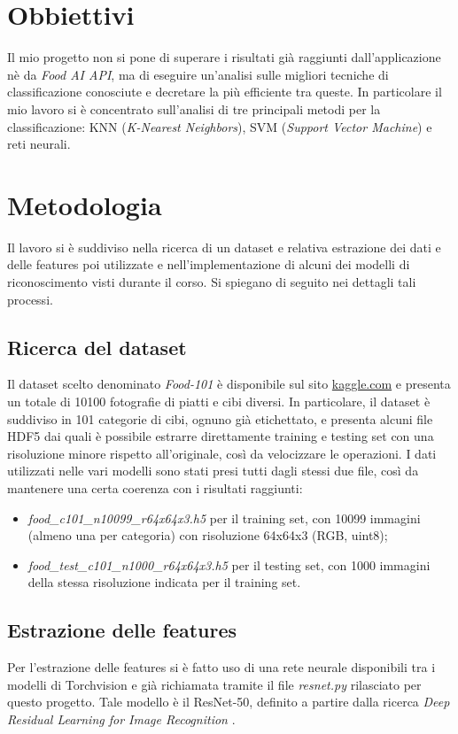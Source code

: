 \documentclass[11pt, a4paper, titlepage]{article}
\begin{document}
\section{Obbiettivi}
Il mio progetto non si pone di superare i risultati già raggiunti dall'applicazione nè da \textit{Food AI API}, ma di eseguire un'analisi sulle migliori tecniche di classificazione conosciute e decretare la più efficiente tra queste. In particolare il mio lavoro si è concentrato sull'analisi di tre principali metodi per la classificazione: KNN (\textit{K-Nearest Neighbors}), SVM (\textit{Support Vector Machine}) e reti neurali. 

\pagebreak

\section{Metodologia}
Il lavoro si è suddiviso nella ricerca di un dataset e relativa estrazione dei dati e delle features poi utilizzate e nell'implementazione di alcuni dei modelli di riconoscimento visti durante il corso. Si spiegano di seguito nei dettagli tali processi. 

\subsection{Ricerca del dataset}
Il dataset scelto denominato \emph{Food-101} \cite{food-101} è disponibile sul sito \url{kaggle.com} e presenta un totale di 10100 fotografie di piatti e cibi diversi. In particolare, il dataset è suddiviso in 101 categorie di cibi, ognuno già etichettato, e presenta alcuni file HDF5 dai quali è possibile estrarre direttamente training e testing set con una risoluzione minore rispetto all'originale, così da velocizzare le operazioni. I dati utilizzati nelle vari modelli sono stati presi tutti dagli stessi due file, così da mantenere una certa coerenza con i risultati raggiunti:
\begin{itemize}
    \item \textit{food\_c101\_n10099\_r64x64x3.h5} per il training set, con 10099 immagini (almeno una per categoria) con risoluzione 64x64x3 (RGB, uint8);
    \item \textit{food\_test\_c101\_n1000\_r64x64x3.h5} per il testing set, con 1000 immagini della stessa risoluzione indicata per il training set. 
\end{itemize}

\subsection{Estrazione delle features}
Per l'estrazione delle features si è fatto uso di una rete neurale disponibili tra i modelli di Torchvision e già richiamata tramite il file \emph{resnet.py} rilasciato per questo progetto. Tale modello è il ResNet-50, definito a partire dalla ricerca \emph{Deep Residual Learning for Image Recognition} \cite{resnet50}.
\end{document}
